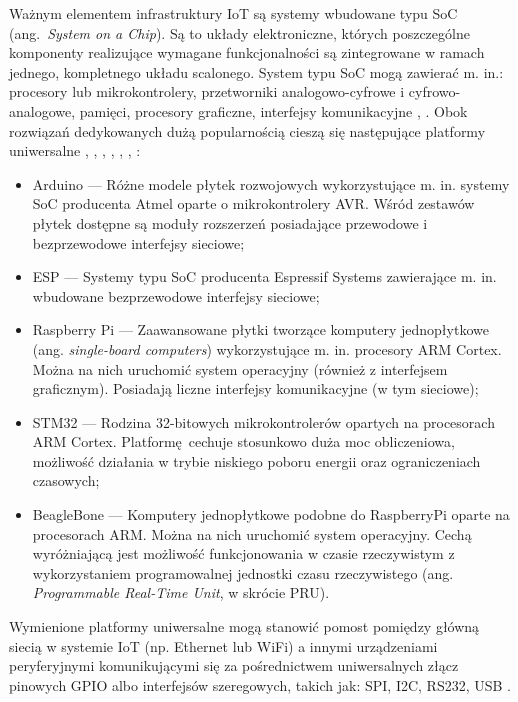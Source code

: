 \documentclass[a4paper, 12pt, twoside]{article}
\begin{document}
Ważnym elementem
infrastruktury IoT są systemy wbudowane typu SoC (ang.~\emph{System on a Chip}).
Są to układy elektroniczne, których poszczególne komponenty realizujące wymagane
funkcjonalności są zintegrowane w ramach jednego, kompletnego układu scalonego.
System typu SoC mogą zawierać m. in.: procesory lub mikrokontrolery, przetworniki
analogowo-cyfrowe i cyfrowo-analogowe, pamięci, procesory graficzne, interfejsy komunikacyjne \cite{intro-to-iot}, \cite{soc}.
Obok rozwiązań dedykowanych dużą popularnością cieszą się następujące platformy uniwersalne \cite{intro-to-iot},
\cite{rpi}, \cite{stm32}, \cite{mikrokontrolery-stm32}, \cite{beaglebone}, \cite{beaglebone-rtu}, \cite{beaglebone-vs-rpi}:
\begin{itemize}
      \itemsep0em
      \item Arduino --- Różne modele płytek rozwojowych wykorzystujące m. in. systemy
            SoC producenta Atmel oparte o mikrokontrolery AVR. Wśród zestawów płytek
            dostępne są moduły rozszerzeń posiadające przewodowe i bezprzewodowe interfejsy sieciowe;
      \item ESP --- Systemy typu SoC producenta Espressif Systems zawierające m. in. wbudowane
            bezprzewodowe interfejsy sieciowe;
      \item Raspberry Pi --- Zaawansowane płytki tworzące komputery jednopłytkowe (ang. \emph{single-board computers})
            wykorzystujące m. in. procesory ARM Cortex.
            Można na nich uruchomić system operacyjny (również z interfejsem graficznym). Posiadają liczne
            interfejsy komunikacyjne (w tym sieciowe);
      \item STM32 --- Rodzina 32-bitowych mikrokontrolerów opartych na procesorach
            ARM Cortex. Platformę cechuje stosunkowo duża moc obliczeniowa, możliwość działania w trybie niskiego poboru energii
            oraz ograniczeniach czasowych;
      \item BeagleBone --- Komputery jednopłytkowe podobne do RaspberryPi
            oparte na procesorach ARM. Można na nich uruchomić system operacyjny.
            Cechą wyróżniającą jest możliwość funkcjonowania w czasie rzeczywistym
            z wykorzystaniem programowalnej jednostki czasu rzeczywistego
            (ang. \emph{Programmable Real-Time Unit}, w skrócie PRU).
\end{itemize}
Wymienione platformy uniwersalne mogą stanowić pomost pomiędzy główną siecią w systemie
IoT (np. Ethernet lub WiFi) a innymi urządzeniami
peryferyjnymi komunikującymi się za pośrednictwem
uniwersalnych złącz pinowych GPIO albo interfejsów szeregowych, takich jak: SPI, I2C, RS232, USB \cite{intro-to-iot}.
\end{document}
